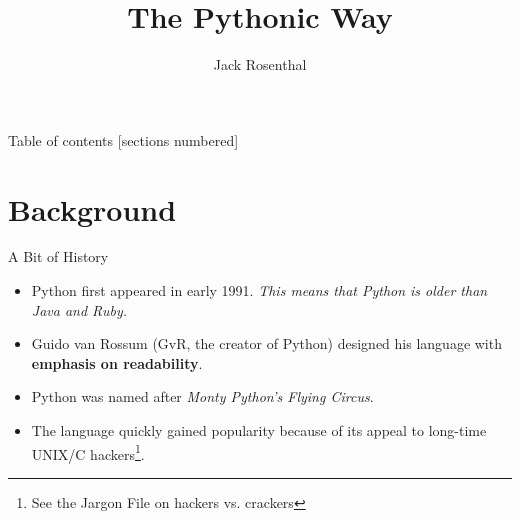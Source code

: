 \documentclass{lug}
\title{The Pythonic Way}
\author{Jack Rosenthal}
\institute{Mines Linux Users Group}
\begin{document}
\begin{frame}{Table of contents}
    [sections numbered]
    \tableofcontents[hideallsubsections]
\end{frame}

\section{Background}

\begin{frame}{A Bit of History}
    \begin{itemize}[<+->]
        \item Python first appeared in early 1991. \emph{This means that Python
            is older than Java and Ruby.}
        \item Guido van Rossum (GvR, the creator of Python) designed his
            language with \textbf{emphasis on readability}.
        \item Python was named after \emph{Monty Python's Flying Circus}.
        \item The language quickly gained popularity because of its appeal to
            long-time UNIX/C hackers\footnote{See the Jargon File on hackers
            vs.  crackers}.
    \end{itemize}
\end{frame}
\end{document}
